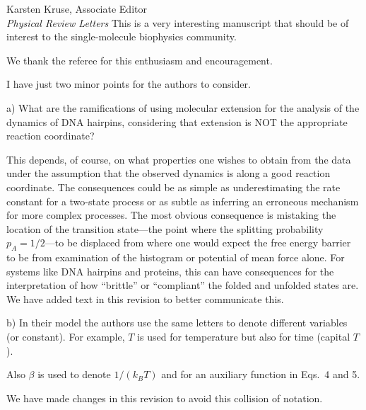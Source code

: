 \documentclass[ucb,qb3,10pt,fullfrom]{ucletter}
\begin{document}
\begin{letter}{Karsten Kruse, Associate Editor\\
\emph{Physical Review Letters}}
This is a very interesting manuscript that should be of interest to
the single-molecule biophysics community.

\color{black}
We thank the referee for this enthusiasm and encouragement.

\color{blue}
I have just two minor points for the authors to consider.

a) What are the ramifications of using molecular extension for the
analysis of the dynamics of DNA hairpins, considering that extension
is NOT the appropriate reaction coordinate?

\color{black}
This depends, of course, on what properties one wishes to obtain from the data under the assumption that the observed dynamics is along a good reaction coordinate.
The consequences could be as simple as underestimating the rate constant for a two-state process or as subtle as inferring an erroneous mechanism for more complex processes.
The most obvious consequence is mistaking the location of the transition state---the point where the splitting probability $p_A = 1/2$---to be displaced from where one would expect the free energy barrier to be from examination of the histogram or potential of mean force alone.
For systems like DNA hairpins and proteins, this can have consequences for the interpretation of how ``brittle'' or ``compliant'' the folded and unfolded states are.
We have added text in this revision to better communicate this.

\color{blue}
b) In their model the authors use the same letters to denote different
variables (or constant). For example, $T$ is used for temperature but
also for time (capital $T$).

Also $\beta$ is used to denote $1/(k_B T)$ and for an auxiliary function in Eqs.~4 and 5.

\color{black}
We have made changes in this revision to avoid this collision of notation.


\end{letter}
\end{document}
